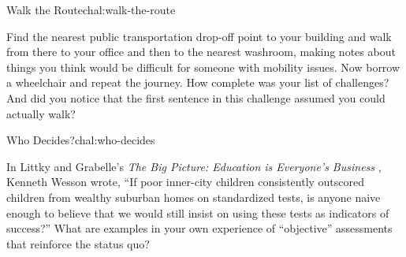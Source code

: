 \begin{challenge}{Walk the Route}{chal:walk-the-route}

Find the nearest public transportation drop-off point to your building
and walk from there to your office and then to the nearest washroom,
making notes about things you think would be difficult for someone with
mobility issues. Now borrow a wheelchair and repeat the journey. How
complete was your list of challenges? And did you notice that the first
sentence in this challenge assumed you could actually walk?

\end{challenge}

\begin{challenge}{Who Decides?}{chal:who-decides}

In Littky and Grabelle's
\emph{The Big Picture: Education is Everyone's Business} \cite{bib:littky-big-picture},
Kenneth Wesson wrote, ``If poor inner-city children consistently
outscored children from wealthy suburban homes on standardized tests,
is anyone naive enough to believe that we would still insist on using
these tests as indicators of success?'' What are examples in your own
experience of ``objective'' assessments that reinforce the status quo?

\end{challenge}
